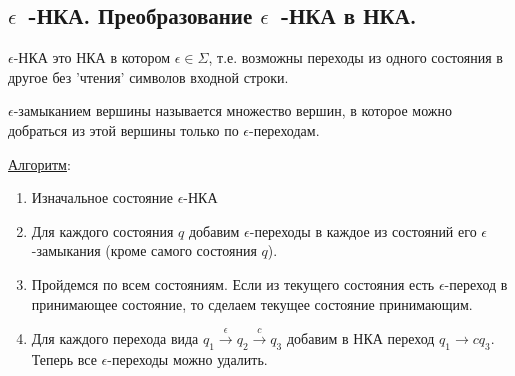 \subsection{%
  \(\epsilon\)~-НКА. Преобразование \(\epsilon\)~-НКА в НКА.%
}

\begin{definition}
  \(\epsilon\)-НКА это НКА в котором \(\epsilon \in \Sigma\), т.е. возможны
  переходы из одного состояния в другое без 'чтения' символов входной строки.
\end{definition}

\begin{definition}
  \(\epsilon\)-замыканием вершины называется множество вершин, в которое можно
  добраться из этой вершины только по \(\epsilon\)-переходам.
\end{definition}

\underline{Алгоритм}:





\begin{enumerate}
  \item Изначальное состояние \(\epsilon\)-НКА
  
  \item Для каждого состояния \(q\) добавим \(\epsilon\)-переходы в каждое из
  состояний его \(\epsilon\)-замыкания (кроме самого состояния \(q\)).

  \item Пройдемся по всем состояниям. Если из текущего состояния есть
  \(\epsilon\)-переход в принимающее состояние, то сделаем текущее состояние
  принимающим.

  \item Для каждого перехода вида
  \(q_{1} \xrightarrow{\epsilon} q_{2} \xrightarrow{c} q_{3}\)
  добавим в НКА переход \(q_{1} \rightarrow{c} q_{3}\).
  Теперь все \(\epsilon\)-переходы можно удалить.
\end{enumerate}
